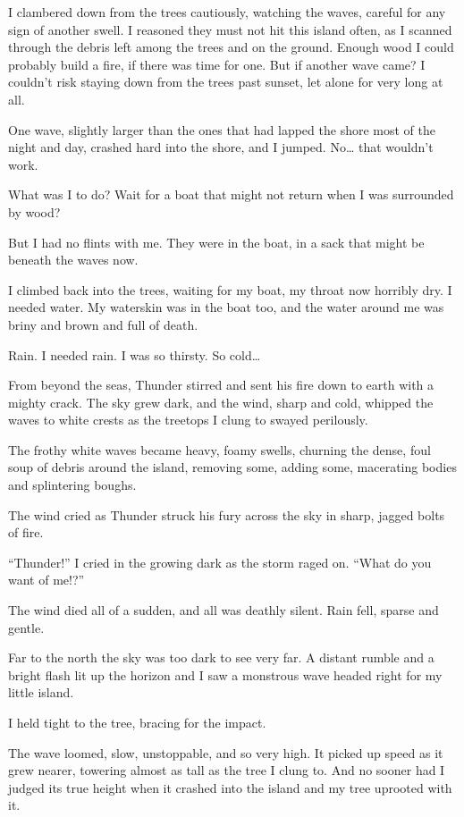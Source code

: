 I clambered down from the trees cautiously, watching the waves, careful for any sign of another swell. I reasoned they must not hit this island often, as I scanned through the debris left among the trees and on the ground. Enough wood I could probably build a fire, if there was time for one. But if another wave came? I couldn't risk staying down from the trees past sunset, let alone for very long at all.

One wave, slightly larger than the ones that had lapped the shore most of the night and day, crashed hard into the shore, and I jumped. No\ldots{} that wouldn't work.

What was I to do? Wait for a boat that might not return when I was surrounded by wood?

But I had no flints with me. They were in the boat, in a sack that might be beneath the waves now.

I climbed back into the trees, waiting for my boat, my throat now horribly dry. I needed water. My waterskin was in the boat too, and the water around me was briny and brown and full of death.

Rain. I needed rain. I was so thirsty. So cold\ldots{}

From beyond the seas, Thunder stirred and sent his fire down to earth with a mighty crack. The sky grew dark, and the wind, sharp and cold, whipped the waves to white crests as the treetops I clung to swayed perilously.

The frothy white waves became heavy, foamy swells, churning the dense, foul soup of debris around the island, removing some, adding some, macerating bodies and splintering boughs.

The wind cried as Thunder struck his fury across the sky in sharp, jagged bolts of fire.

``Thunder!'' I cried in the growing dark as the storm raged on. ``What do you want of me!?''

The wind died all of a sudden, and all was deathly silent. Rain fell, sparse and gentle.

Far to the north the sky was too dark to see very far. A distant rumble and a bright flash lit up the horizon and I saw a monstrous wave headed right for my little island.

I held tight to the tree, bracing for the impact.

The wave loomed, slow, unstoppable, and so very high. It picked up speed as it grew nearer, towering almost as tall as the tree I clung to. And no sooner had I judged its true height when it crashed into the island and my tree uprooted with it.

